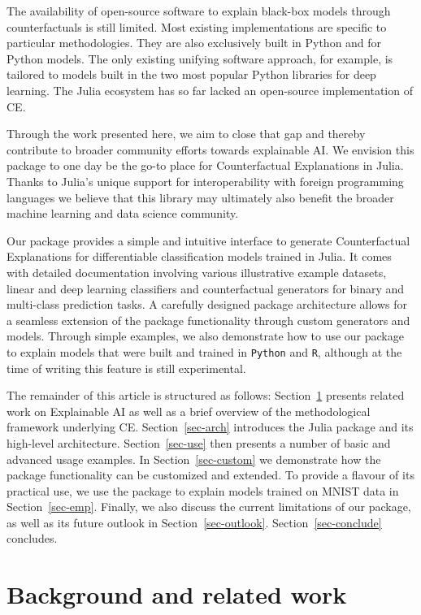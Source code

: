 \documentclass[
  letterpaper,
  DIV=11,
  numbers=noendperiod]{scrartcl}
\begin{document}
The availability of open-source software to explain black-box models
through counterfactuals is still limited. Most existing implementations
are specific to particular methodologies. They are also exclusively
built in Python and for Python models. The only existing unifying
software approach, for example, is tailored to models built in the two
most popular Python libraries for deep learning. The Julia ecosystem has
so far lacked an open-source implementation of CE.

Through the work presented here, we aim to close that gap and thereby
contribute to broader community efforts towards explainable AI. We
envision this package to one day be the go-to place for Counterfactual
Explanations in Julia. Thanks to Julia's unique support for
interoperability with foreign programming languages we believe that this
library may ultimately also benefit the broader machine learning and
data science community.

Our package provides a simple and intuitive interface to generate
Counterfactual Explanations for differentiable classification models
trained in Julia. It comes with detailed documentation involving various
illustrative example datasets, linear and deep learning classifiers and
counterfactual generators for binary and multi-class prediction tasks. A
carefully designed package architecture allows for a seamless extension
of the package functionality through custom generators and models.
Through simple examples, we also demonstrate how to use our package to
explain models that were built and trained in \texttt{Python} and
\texttt{R}, although at the time of writing this feature is still
experimental.

The remainder of this article is structured as follows:
Section~\ref{sec-related} presents related work on Explainable AI as
well as a brief overview of the methodological framework underlying CE.
Section~\ref{sec-arch} introduces the Julia package and its high-level
architecture. Section~\ref{sec-use} then presents a number of basic and
advanced usage examples. In Section~\ref{sec-custom} we demonstrate how
the package functionality can be customized and extended. To provide a
flavour of its practical use, we use the package to explain models
trained on MNIST data in Section~\ref{sec-emp}. Finally, we also discuss
the current limitations of our package, as well as its future outlook in
Section~\ref{sec-outlook}. Section~\ref{sec-conclude} concludes.

\hypertarget{sec-related}{%
\section{Background and related work}\label{sec-related}}
\end{document}
